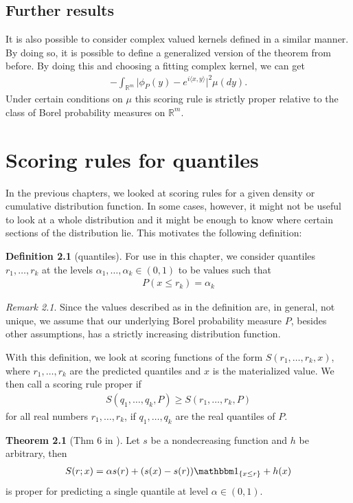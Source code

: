 \documentclass{def/tuberlin}
\theoremstyle{definition}
\newtheorem{definition}{Definition}[section]
\newtheorem{theorem}{Theorem}[section]
\theoremstyle{remark}
\newtheorem*{remark}{Remark}
\begin{document}
\section{Further results}
It is also possible to consider complex valued kernels defined in a similar manner. By doing so, it is possible to define a generalized version of the theorem from before. By doing this and choosing a fitting complex kernel, we can get \begin{align*}
    -\int_{\mathbb R^m}\lvert \phi_P(y)-e^{i\langle x,y\rangle}\rvert^2\mu(dy).
\end{align*}
Under certain conditions on $\mu$ this scoring rule is strictly proper relative to the class of Borel probability measures on $\mathbb R^m$.
\chapter{Scoring rules for quantiles}
In the previous chapters, we looked at scoring rules for a given density or cumulative distribution function. In some cases, however, it might not be useful to look at a whole distribution and it might be enough to know where certain sections of the distribution lie. This motivates the following definition: 
\begin{definition}[quantiles]
For use in this chapter, we consider quantiles $r_1,\dots,r_k$ at the levels $\alpha_1,\dots,\alpha_k\in (0,1)$ to be values such that \begin{align*}
    P(x\leq r_k)=\alpha_k
\end{align*}
\end{definition}
\begin{remark}
    Since the values described as in the definition are, in general, not unique, we assume that our underlying Borel probability measure $P$, besides other assumptions, has a strictly increasing distribution function.
\end{remark}
With this definition, we look at scoring functions of the form $S(r_1,\dots,r_k,x)$, where $r_1,\dots,r_k$ are the predicted quantiles and $x$ is the materialized value. We then call a scoring rule proper if \begin{align*}
    S(q_1,\dots,q_k,P)\geq S(r_1,\dots,r_k,P)
\end{align*}
for all real numbers $r_1,\dots,r_k$, if $q_1,\dots,q_k$ are the real quantiles of $P$.
\begin{theorem}[Thm 6 in \cite{Gneiting}]
    Let $s$ be a nondecreasing function and $h$ be arbitrary, then \begin{align*}
        S(r;x)=\alpha s(r)+(s(x)-s(r))\mathbbm 1_{\{x\leq r\}}+h(x)
    \end{align*} 
    is proper for predicting a single quantile at level $\alpha\in(0,1)$.
\end{theorem}
\end{document}
